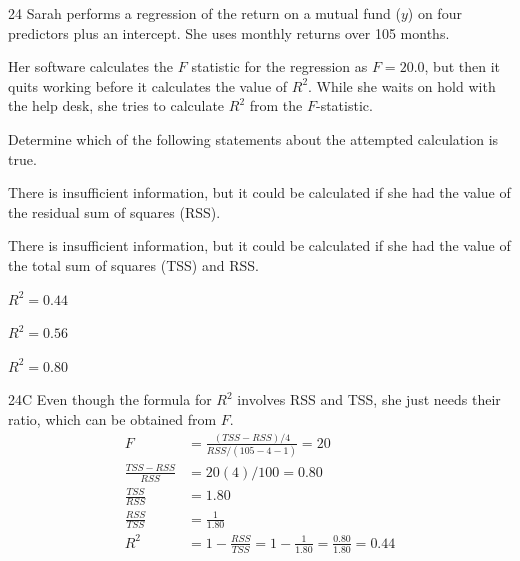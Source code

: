 \begin{question}{24}
Sarah performs a regression of the return on a mutual fund ($y$) on four predictors plus an intercept. She uses monthly returns over 105 months.

Her software calculates the $F$ statistic for the regression as $F = 20.0$, but then it quits working before it calculates the value of $R^2$. While she waits on hold with the help desk, she tries to calculate $R^2$ from the $F$-statistic.

Determine which of the following statements about the attempted calculation is true.

\begin{choices}
\item There is insufficient information, but it could be calculated if she had the value of the residual sum of squares (RSS).
\item There is insufficient information, but it could be calculated if she had the value of the total sum of squares (TSS) and RSS.
\item $R^2 = 0.44$
\item $R^2 = 0.56$
\item $R^2 = 0.80$
\end{choices}
\end{question}
\begin{solution}{24}{C}
Even though the formula for $R^2$ involves RSS and TSS, she just needs their ratio, which can be obtained from $F$.
\begin{align*}
F &= \frac{(TSS - RSS)/4}{RSS/(105 - 4 - 1)} = 20 \\
\frac{TSS - RSS}{RSS} &= 20(4)/100 = 0.80 \\
\frac{TSS}{RSS} &= 1.80 \\
\frac{RSS}{TSS} &= \frac{1}{1.80} \\
R^2 &= 1 - \frac{RSS}{TSS} = 1 - \frac{1}{1.80} = \frac{0.80}{1.80} = 0.44
\end{align*}
\end{solution}

